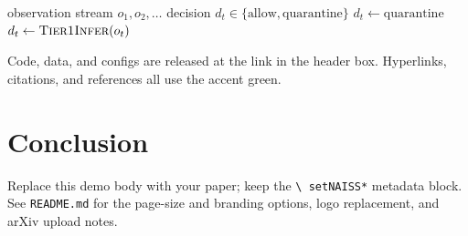 \documentclass[11pt]{article}
\begin{document}
\begin{algorithm}[t]
  \caption{Demo gatekeeper loop}
  \label{alg:demo}
  \begin{algorithmic}[1]
    \Require observation stream $o_1, o_2, \dots$
    \Ensure decision $d_t \in \{\text{allow}, \text{quarantine}\}$
        \State $d_t \gets \text{quarantine}$
      \Else
        \State $d_t \gets \textsc{Tier1Infer}(o_t)$
      \EndIf
    \EndFor
  \end{algorithmic}
\end{algorithm}

\begin{naissbox}[Reproducibility]
Code, data, and configs are released at the link in the header box.
Hyperlinks, citations, and references all use the accent green.
\end{naissbox}

\FloatBarrier
\section{Conclusion}
\label{sec:conclusion}

Replace this demo body with your paper; keep the \texttt{\textbackslash
setNAISS*} metadata block. See \texttt{README.md} for the page-size and
branding options, logo replacement, and arXiv upload notes.



\end{document}
